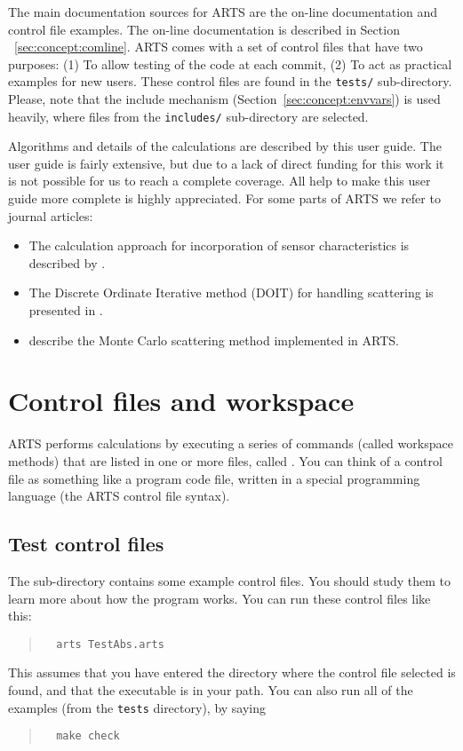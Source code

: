 The main documentation sources for ARTS are the on-line documentation
and control file examples. The on-line documentation is described in
Section ~\ref{sec:concept:comline}. ARTS comes with a set of control
files that have two purposes: (1) To allow testing of the code at each
commit, (2) To act as practical examples for new users. These control
files are found in the \verb|tests/| sub-directory. Please, note that the
include mechanism (Section~\ref{sec:concept:envvars}) is used heavily,
where files from the \verb|includes/| sub-directory are selected.

Algorithms and details of the calculations are described by this user
guide. The user guide is fairly extensive, but due to a lack of direct
funding for this work it is not possible for us to reach a complete
coverage. All help to make this user guide more complete is highly
appreciated. For some parts of ARTS we refer to journal articles:
\begin{itemize}
\item The calculation approach for incorporation of sensor
  characteristics is described by \citet{eriksson:06}.
\item The Discrete Ordinate Iterative method (DOIT) for handling scattering
  is presented in \citet{emde04:_doit_jgr}.
\item \citet{davisetal:04} describe the Monte Carlo scattering method
  implemented in ARTS.
\end{itemize}


\section{Control files and workspace}

ARTS performs calculations by executing a series of commands (called
workspace methods) that are listed in one or more files, called
. You can think of a control file as something like a
program code file, written in a special programming language (the ARTS
control file syntax).

\subsection{Test control files}

The sub-directory  contains some example control files.
You should study them to learn more about how the program works. You
can run these control files like this:
\begin{quote}
\begin{verbatim}
  arts TestAbs.arts
\end{verbatim}
\end{quote}
This assumes that you have entered the directory where the control
file selected is found, and that the  executable is in
your path. You can also run all of the examples (from the \verb|tests|
directory), by saying
\begin{quote}
\begin{verbatim}
  make check
\end{verbatim}
\end{quote}


